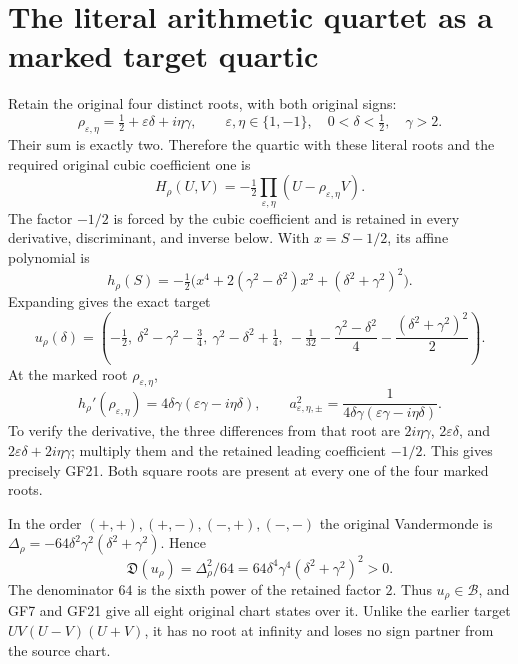 \documentclass[11pt]{article}
\begin{document}
\section{The literal arithmetic quartet as a marked target quartic}
Retain the original four distinct roots, with both original signs:
\[
 \rho_{\varepsilon,\eta}=\tfrac12+\varepsilon\delta+i\eta\gamma,
 \qquad\varepsilon,\eta\in\{1,-1\},\quad
 0<\delta<\tfrac12,\quad\gamma>2.
\]
Their sum is exactly two. Therefore the quartic with these literal
roots and the required original cubic coefficient one is
\begin{equation}
 H_\rho(U,V)=-\tfrac12\prod_{\varepsilon,\eta}
                    (U-\rho_{\varepsilon,\eta}V).\tag{GF19}
\end{equation}
The factor $-1/2$ is forced by the cubic coefficient and is retained
in every derivative, discriminant, and inverse below. With
$x=S-1/2$, its affine polynomial is
\[
 h_\rho(S)=-\tfrac12\bigl(x^4+2(\gamma^2-\delta^2)x^2
                              +(\delta^2+\gamma^2)^2\bigr).
\]
Expanding gives the exact target
\begin{equation}
 u_\rho(\delta)=\left(-\tfrac12,\
 \delta^2-\gamma^2-\tfrac34,\
 \gamma^2-\delta^2+\tfrac14,\
 -\tfrac1{32}-\frac{\gamma^2-\delta^2}{4}
                     -\frac{(\delta^2+\gamma^2)^2}{2}\right).
 \tag{GF20}
\end{equation}
At the marked root $\rho_{\varepsilon,\eta}$,
\begin{equation}
 h_\rho'(\rho_{\varepsilon,\eta})
       =4\delta\gamma(\varepsilon\gamma-i\eta\delta),\qquad
 a_{\varepsilon,\eta,\pm}^{2}
       =\frac1{4\delta\gamma(\varepsilon\gamma-i\eta\delta)}.
 \tag{GF21}
\end{equation}
To verify the derivative, the three differences from that root are
$2i\eta\gamma$, $2\varepsilon\delta$, and
$2\varepsilon\delta+2i\eta\gamma$; multiply them and the retained
leading coefficient $-1/2$. This gives precisely GF21. Both square
roots are present at every one of the four marked roots.

In the order $(+,+),(+,-),(-,+),(-,-)$ the original Vandermonde is
$\Delta_\rho=-64\delta^2\gamma^2(\delta^2+\gamma^2)$. Hence
\begin{equation}
 \mathfrak D(u_\rho)=\Delta_\rho^2/64
                   =64\delta^4\gamma^4(\delta^2+\gamma^2)^2>0.
 \tag{GF22}
\end{equation}
The denominator $64$ is the sixth power of the retained factor
$2$. Thus $u_\rho\in\mathcal B$, and GF7 and GF21 give all
eight original chart states over it. Unlike the earlier target
$UV(U-V)(U+V)$, it has no root at infinity and loses no sign
partner from the source chart.
\end{document}
